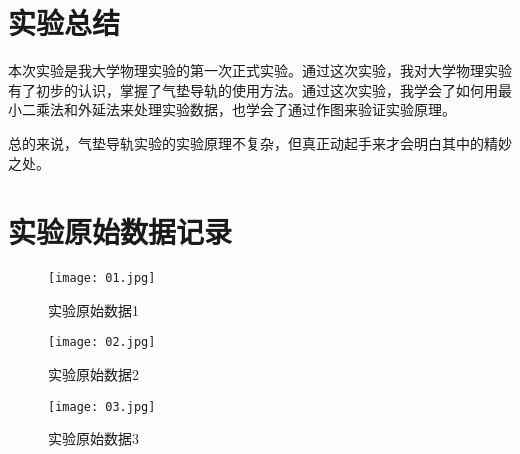 \documentclass[11pt]{article}
\begin{document}
\section{实验总结}

本次实验是我大学物理实验的第一次正式实验。通过这次实验，我对大学物理实验有了初步的认识，掌握了气垫导轨的使用方法。通过这次实验，我学会了如何用最小二乘法和外延法来处理实验数据，也学会了通过作图来验证实验原理。

总的来说，气垫导轨实验的实验原理不复杂，但真正动起手来才会明白其中的精妙之处。

\section{实验原始数据记录}

\begin{figure}[H]
    \centering
    \texttt{[image: 01.jpg]}
    \caption{实验原始数据1}
\end{figure}

\begin{figure}[H]
    \centering
    \texttt{[image: 02.jpg]}
    \caption{实验原始数据2}
\end{figure}

\begin{figure}[H]
    \centering
    \texttt{[image: 03.jpg]}
    \caption{实验原始数据3}
\end{figure}
\end{document}
